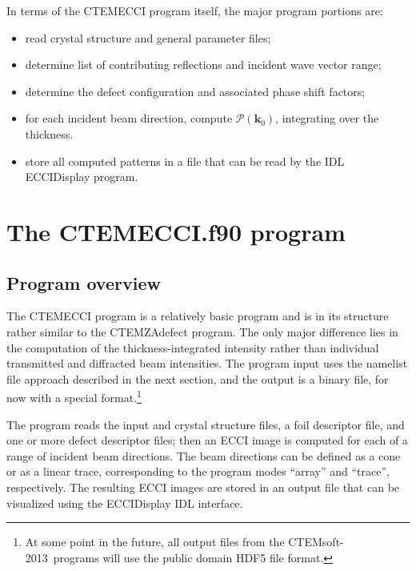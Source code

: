 \documentclass[DIV=calc, paper=letter, fontsize=11pt]{scrartcl}	 %
\newcommand{\ctp}{\textsf{CTEMsoft-2013}}
\begin{document}
In terms of the \textsf{CTEMECCI} program itself, the major program portions are:
\begin{itemize}
	\item read crystal structure and general parameter files;
	\item determine list of contributing reflections and incident wave vector range;
	\item determine the defect configuration and associated phase shift factors;
	\item for each incident beam direction, compute $\mathcal{P}(\mathbf{k}_0)$, integrating over the thickness.
	\item store all computed patterns in a file that can be read by the IDL \textsf{ECCIDisplay} program.
\end{itemize}

\section{The \protect\textsf{CTEMECCI.f90} program\label{sec:f90ecci}}

\subsection{Program overview\label{sec:f90overviewecci}}
The \textsf{CTEMECCI} program is a relatively basic program and is in its structure rather similar to the \textsf{CTEMZAdefect} program.
The only major difference lies in the computation of the thickness-integrated intensity rather than individual transmitted and 
diffracted beam intensities.  The program input uses the namelist file approach described in the next section, and the output is a 
binary file, for now with a special format.\footnote{At some point in the future, all output files from the \ctp\ programs will use
the public domain HDF5 file format.}  

The program reads the input and crystal structure files,  a foil descriptor file, and one or more defect descriptor files; then an ECCI image is computed for 
each of a range of incident beam directions.  The beam directions can be defined as a cone or as a linear trace, corresponding to the program modes
``array'' and ``trace'', respectively.  The resulting ECCI images are stored in an output file that can be visualized using the \textsf{ECCIDisplay} IDL interface.
\end{document}
